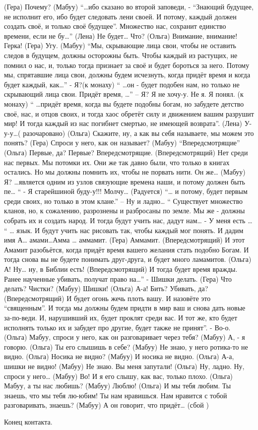  (Гера)   Почему?
 (Мабуу)  ``…ибо сказано во второй заповеди, - ``Знающий будущее,  не исполнит его, ибо будет следовать лени своей. И  потому,  каждый должен создать своё, и только своё  будущее''. Множество нас, сохранит единство времени, если не бу…''
 (Лена)  Не будет… Что?
 (Ольга) Внимание, внимание! Герка!
 (Гера)  Угу.
 (Мабуу) ``Мы, скрывающие лица свои, чтобы не оставить следов в будущем, должны осторожны быть. Чтобы каждый из растущих, не помнил о нас, и, только тогда признает за своё и будет бороться за него. Потому мы, спрятавшие лица свои, должны будем исчезнуть, когда придёт время и когда будет каждый, как…'' - Я?(к монаху) `` …он  - будет подобен нам, но только не скрывающий лица свои. Придёт время, …'' – Я? Я не хочу-у.  Не я. Я понял. (к монаху) `` …придёт время, когда вы будете подобны богам, но забудете детство своё, нас, и отцов своих, и тогда хаос обретёт силу и движением вашим разрушит мир!  И тогда каждый из нас погибнет смертью, не имеющей возврата''.
 (Лена)  У-у-у…( разочаровано)
 (Ольга) Скажите, ну, а как вы себя называете, мы можем это понять?
 (Гера)  Спроси у него, как он называет?
 (Мабуу) ``Впередсмотрящие''
 (Ольга)  Первые, да? Первые? Впередсмотрящие.
 (Впередсмотрящий) Нет среди нас первых. Мы потомки их. Они же так давно были, что только в книгах остались. Но мы должны помнить их, чтобы не порвать нити. Он же… (Мабуу) Я? …является одним из узлов связующие времена наши, и потому должен быть пе… ``  - Я старейшиной буду-у!!! Молчу…  (Радуется) ``… и потому, будет первым среди своих, но только в этом клане.'' – Ну и ладно… `` Существует множество кланов, но, к сожалению, разрознены и разбросаны по земле. Мы же - должны собрать их и создать народ. И тогда будут учить нас, дадут нам… - У меня есть … `` … язык. И будут учить нас рисовать так, чтобы каждый мог понять. И дадим имя  А… амами…Амма … аммамит. 
 (Гера)  Аммамит.
 (Впередсмотрящий) И этот Амамит разобьётся, когда придёт время вашего желания стать подобно Богам. И тогда снова вы не будете понимать друг-друга, и будет много ламамитов. 
 (Ольга) А! Ну… ну, в Библии есть!
 (Впередсмотрящий)  И тогда будет время вражды. Ранее наученные убивать, получат право на…'' -  Шишки делать.
 (Гера)    Что делать? Чистки?
 (Мабуу)   Шишки!
 (Ольга)   А-а!  Бить? Убивать, да? 
 (Впередсмотрящий) И будет огонь жечь плоть вашу. И назовёте это ``священным''. И тогда мы должны будем придти в мир ваш и снова дать новые за-по-веди. И, нарушивший их, будет проклят среди вас. И тот же, кто будет исполнять только их и забудет про другие, будет также не принят''. - Во-о.
 (Ольга) Мабуу, спроси у него, как он разговаривает через тебя?
 (Мабуу) А, - я говорю.
 (Ольга) Ты его слышишь в себе? 
 (Мабуу) Не знаю,  у него  ротика-то  не видно.
 (Ольга)  Носика не видно?
 (Мабуу)  И носика не видно.
 (Ольга)  А-а, шишки не видно! 
 (Мабуу)  Не знаю. Вы меня запутали!
 (Ольга)  Ну, ладно. Ну, спроси у него…
 (Мабуу)  Во! И я его слышу, как вас, только плохо.
 (Ольга)  Мабуу, а ты нас любишь?
 (Мабуу)  Люблю!
 (Ольга)  И мы тебя любим. Ты знаешь, что мы тебя лю-юбим! Ты нам нравишься. Нам нравится с тобой разговаривать, знаешь? 
 (Мабуу)  А он говорит, что придёт…
 (сбой )
 
 Конец контакта.